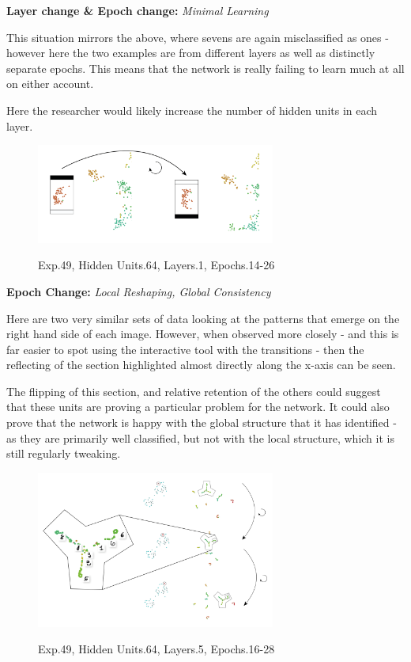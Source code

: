 \documentclass[a4paper,11pt,titlepage]{article}
\begin{document}
	\textbf{Layer change \& Epoch change:} \textit{Minimal Learning}
	\par 
	This situation mirrors the above, where sevens are again misclassified as ones - however here the two examples are from different layers as well as distinctly separate epochs. This means that the network is really failing to learn much at all on either account. 
	\par 
	Here the researcher would likely increase the number of hidden units in each layer.


	\begin{figure}[H]
    			\centering	
			{{\includegraphics[width=0.7\textwidth]
    				{img/conc_X49_H64_L1_E14-26.png} 
    			}}%
    			\caption{Exp.49, Hidden Units.64, Layers.1, Epochs.14-26}%
    		\label{fig:mnistHinton}
	\end{figure}
	
	\textbf{Epoch Change:} \textit{Local Reshaping, Global Consistency}
	\par 
	Here are two very similar sets of data looking at the patterns that emerge on the right hand side of each image. However, when observed more closely - and this is far easier to spot using the interactive tool with the transitions - then the reflecting of the section highlighted almost directly along the x-axis can be seen. 
	\par 
	The flipping of this section, and relative retention of the others could suggest that these units are proving a particular problem for the network. It could also prove that the network is happy with the global structure that it has identified - as they are primarily well classified, but not with the local structure, which it is still regularly tweaking.

	\begin{figure}[H]
    			\centering	
			{{\includegraphics[width=0.7\textwidth]
    				{img/conc_X49_H64_L5_E16-28.png} 
    			}}%
    			\caption{Exp.49, Hidden Units.64, Layers.5, Epochs.16-28}%
    		\label{fig:mnistHinton}
	\end{figure}
\end{document}
